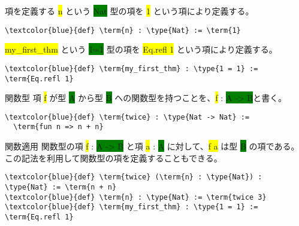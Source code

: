 \documentclass[unicode,12pt]{beamer}%
\newcommand{\type}[1]{\colorbox{green}{#1}}
\newcommand{\term}[1]{\colorbox{yellow}{#1}}
\begin{document}
\begin{frame}[fragile]{項を定義する}
  \term{n} という \type{Nat} 型の項を \term{1} という項により定義する。

  \begin{tcolorbox}[title=FirstTheorem.lean]
  \setlength{\baselineskip}{12pt}
  \begin{Verbatim}[commandchars=\\\{\}, baselinestretch=1.5]
\textcolor{blue}{def} \term{n} : \type{Nat} := \term{1}    
  \end{Verbatim}
  \end{tcolorbox}  

  \pause

  \term{my\_first\_thm} という \type{1=1} 型の項を \term{Eq.refl 1} という項により定義する。
  \begin{tcolorbox}[title=FirstTheorem.lean]
  \setlength{\baselineskip}{12pt}
  \begin{Verbatim}[commandchars=\\\{\}, baselinestretch=1.5]
\textcolor{blue}{def} \term{my_first_thm} : \type{1 = 1} := \term{Eq.refl 1}    
  \end{Verbatim}
  \end{tcolorbox}  
\end{frame}

\begin{frame}[fragile]{関数型}
  項 \term{f} が型 \type{A} から型 \type{B} への関数型を持つことを、\term{f} : \type{A -> B}と書く。

  \begin{tcolorbox}[title=FirstTheorem.lean]
  \setlength{\baselineskip}{12pt}
  \begin{Verbatim}[commandchars=\\\{\}, baselinestretch=1.5]
\textcolor{blue}{def} \term{twice} : \type{Nat -> Nat} :=
  \term{fun n => n + n}
  \end{Verbatim}
  \end{tcolorbox}  
\end{frame}


\begin{frame}[fragile]{関数適用}
  関数型の項 \term{f} : \type{A -> B} と項 \term{a} : \type{A} に対して、\term{f a} は型 \type{B} の項である。
  この記法を利用して関数型の項を定義することもできる。

  \pause

  \begin{tcolorbox}[title=FirstTheorem.lean]
  \setlength{\baselineskip}{12pt}
  \begin{Verbatim}[commandchars=\\\{\}, baselinestretch=1.5]
\textcolor{blue}{def} \term{twice} (\term{n} : \type{Nat}) : \type{Nat} := \term{n + n}
\textcolor{blue}{def} \term{n} : \type{Nat} := \term{twice 3}
\textcolor{blue}{def} \term{my_first_thm} : \type{1 = 1} := \term{Eq.refl 1}
  \end{Verbatim}
  \end{tcolorbox}  
\end{frame}
\end{document}
